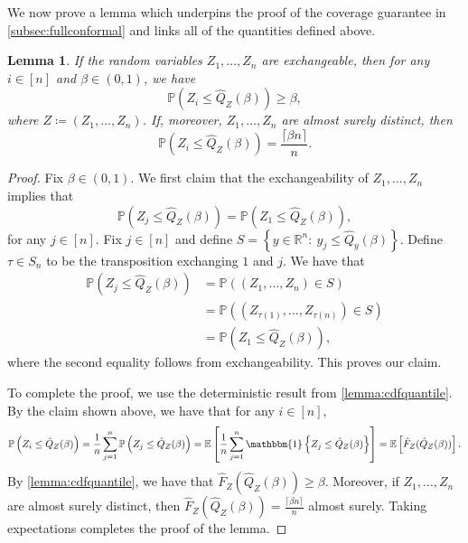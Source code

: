 \documentclass[11pt, titlepage]{article} %
\newcommand{\Prob}[1]{\mathbb{P}\left( #1 \right)}
\newcommand{\Exp}[3]{\mathbb{E}\left#2 #1 \right#3}
\newcommand{\Ind}[1]{\mathbbm{1}\left\{ #1 \right\}}
\numberwithin{equation}{section}
\newtheorem{lemma}{Lemma}
\theoremstyle{definition}
\numberwithin{theorem}{section}
\numberwithin{lemma}{section}
\numberwithin{corollary}{section}
\numberwithin{proposition}{section}
\numberwithin{definition}{section}
\numberwithin{remark}{section}
\begin{document}
\noindent
We now prove a lemma which underpins the proof of the coverage guarantee in \cref{subsec:fullconformal} and links all of the quantities defined above.

\begin{lemma}
    If the random variables \(Z_1, \ldots, Z_n\) are exchangeable, then for any \(i \in [n]\) and \(\beta \in (0,1)\), we have \[\Prob{Z_i \leq \hat{Q}_Z (\beta)} \geq \beta,\] where \(Z \coloneqq (Z_1, \ldots, Z_n)\). If, moreover, \(Z_1, \ldots, Z_n\) are almost surely distinct, then \[\Prob{Z_i \leq \hat{Q}_Z(\beta)} = \frac{\lceil{\beta n}\rceil}{n}.\]
\label{lemma:exch_cdfquantile}
\end{lemma}
\begin{proof}
    Fix \(\beta \in (0,1)\). We first claim that the exchangeability of \(Z_1, \ldots, Z_n\) implies that \[\Prob{Z_j \leq \hat{Q}_Z(\beta)} = \Prob{Z_1 \leq \hat{Q}_Z(\beta)}, \] for any \(j \in [n]\). Fix \(j \in [n]\) and define \(S = \left\{ y \in \mathbb{R}^n : \ y_j \leq \hat{Q}_y(\beta) \right\}.\) Define \(\tau \in S_n\) to be the transposition exchanging \(1\) and \(j\). We have that  
    \begin{align*}
        \Prob{Z_j \leq \hat{Q}_Z(\beta)} &= \Prob{(Z_1, \ldots, Z_n) \in S} \\
        &= \Prob{(Z_{\tau(1)}, \ldots, Z_{\tau(n)}) \in S} \\
        &= \Prob{Z_1 \leq \hat{Q}_Z(\beta)},
    \end{align*} where the second equality follows from exchangeability. This proves our claim. \vskip 5pt
    
    \noindent
    To complete the proof, we use the deterministic result from \cref{lemma:cdfquantile}. By the claim shown above, we have that for any \(i \in [n]\), \begin{align*}
        \Prob{Z_i \leq \hat{Q}_Z(\beta)} = \frac{1}{n} \sum_{j=1}^n \Prob{Z_j \leq \hat{Q}_Z(\beta)} = \mathbb{E} \left[ \frac{1}{n} \sum_{j=1}^n \Ind{Z_j \leq \hat{Q}_Z(\beta)} \right]
        = \Exp{\hat{F}_Z(\hat{Q}_Z(\beta))}{[}{]}.
    \end{align*} By \cref{lemma:cdfquantile}, we have that \(\hat{F}_Z(\hat{Q}_Z(\beta)) \geq \beta\). Moreover, if \(Z_1, \ldots, Z_n\) are almost surely distinct, then \(\hat{F}_Z(\hat{Q}_Z(\beta)) = \frac{\lceil{\beta n}\rceil}{n}\) almost surely. Taking expectations completes the proof of the lemma.
\end{proof}
\end{document}
